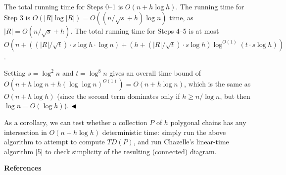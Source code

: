 \par
The total running time for Steps 0–1 is $O(n+h\log h)$. The running time for Step 3 is $O(|R|\log|R|)=O((n/\sqrt{s}+h)\log n)$ time, as $|R|=O(n/\sqrt{s}+h)$. The total running time for Steps 4–5 is at most $O(n+((|R|/\sqrt{t})\cdot s\log h\cdot\log n)+(h+(|R|/\sqrt{t})\cdot s\log h)%
\log^{O(1)}(t\cdot s\log h))$.
\par
\par
Setting $s=\log^{2}n$ and $t=\log^{8}n$ gives an overall time bound of $O(n+h\log n+h(\log\log n)^{O(1)})=O(n+h\log n)$, which is the same as $O(n+h\log h)$ (since the second term dominates only if $h\geq n/\log n$, but then $\log n=O(\log h)$). $\hfill\blacktriangleleft$
\par
\par
As a corollary, we can test whether a collection $P$ of $h$ polygonal chains has any intersection in $O(n+h\log h)$ deterministic time: simply run the above algorithm to attempt to compute $\textit{TD}(P)$, and run Chazelle’s linear-time algorithm [5] to check simplicity of the resulting (connected) diagram.
\par
\par
\par\medskip\noindent\textbf{References}\par
